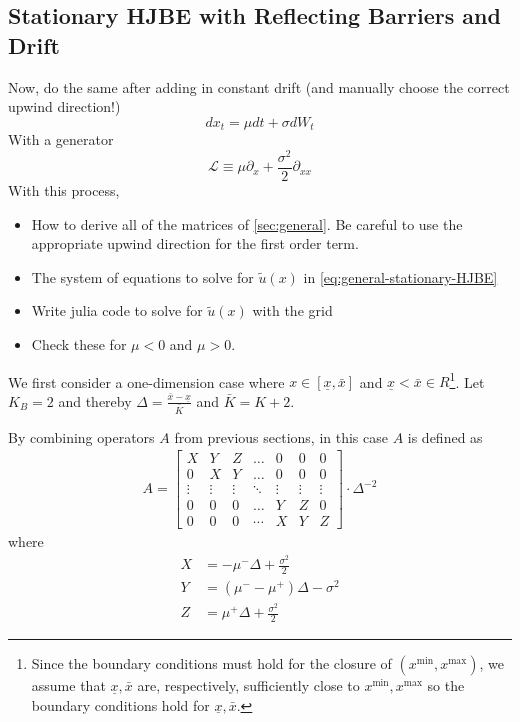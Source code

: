 \documentclass[11pt]{article}
\newcommand{\D}[1][]{\ensuremath{\partial_{#1}}}
\begin{document}
\subsection{Stationary HJBE with Reflecting Barriers and Drift}
Now, do the same after adding in constant drift (and manually choose the correct upwind direction!)
$$
d x_t = \mu dt + \sigma d W_t
$$
With a generator
$$
	\mathcal{L} \equiv \mu \D[x] + \frac{\sigma^2}{2}\D[xx]
$$
With this process,
\begin{itemize}
	\item How to derive all of the matrices of \cref{sec:general}.  Be careful to use the appropriate upwind direction for the first order term.
	\item The system of equations to solve for $\tilde{u}(x)$ in \cref{eq:general-stationary-HJBE}
	\item Write julia code to solve for $\tilde{u}(x)$ with the grid
	\item Check these for $\mu < 0$ and $\mu > 0$.
\end{itemize}

We first consider a one-dimension case where $x\in [\underline{\textit{\~{x}}}, \bar{\textit{\~{x}}}]$ and $\underline{\textit{\~{x}}} < \bar{\textit{\~{x}}} \in R$\footnote{Since the boundary conditions must hold for the closure of $(x^{\min},x^{\max})$, we assume that $\underline{\textit{\~{x}}}, \bar{\textit{\~{x}}}$ are, respectively, sufficiently close to $x^{\min}, x^{\max}$ so the boundary conditions hold for $\underline{\textit{\~{x}}}, \bar{\textit{\~{x}}}$.}. Let $K_B = 2$ and thereby $\Delta  = \frac{\bar{\textit{\~{x}}} - \underline{\textit{\~{x}}}}{\bar{K}}$ and $\bar{K} = K+2$.

By combining operators $A $ from previous sections, in this case $A $ is defined as
\begin{align}
A = \begin{bmatrix}
X&Y&Z&\dots&0&0&0\\
0&X&Y&\dots&0&0&0\\
\vdots&\vdots&\vdots&\ddots&\vdots&\vdots&\vdots\\
0&0&0&\dots&Y&Z&0\\
0&0&0&\cdots&X&Y&Z
\end{bmatrix}\cdot \Delta^{-2}
\end{align}
where
\begin{align*}
X &= -\mu^-\Delta+\frac{\sigma^2}{2}\\
Y &= (\mu^--\mu^+)\Delta-\sigma^2\\
Z &=\mu^+\Delta+\frac{\sigma^2}{2}
\end{align*}
\end{document}
